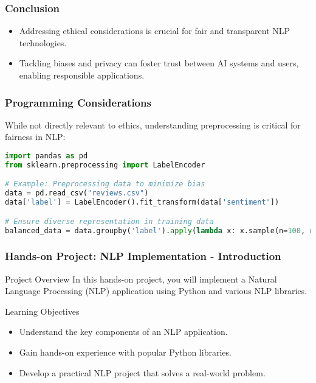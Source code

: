 \documentclass[aspectratio=169]{beamer}
\begin{document}
\begin{frame}
    \frametitle{Conclusion}
    \begin{itemize}
        \item Addressing ethical considerations is crucial for fair and transparent NLP technologies.
        \item Tackling biases and privacy can foster trust between AI systems and users, enabling responsible applications.
    \end{itemize}
\end{frame}

\begin{frame}[fragile]
    \frametitle{Programming Considerations}
    While not directly relevant to ethics, understanding preprocessing is critical for fairness in NLP:
    \begin{lstlisting}[language=Python]
import pandas as pd
from sklearn.preprocessing import LabelEncoder

# Example: Preprocessing data to minimize bias
data = pd.read_csv("reviews.csv")
data['label'] = LabelEncoder().fit_transform(data['sentiment'])

# Ensure diverse representation in training data
balanced_data = data.groupby('label').apply(lambda x: x.sample(n=100, random_state=1))
    \end{lstlisting}
\end{frame}

\begin{frame}[fragile]
    \frametitle{Hands-on Project: NLP Implementation - Introduction}
    \begin{block}{Project Overview}
        In this hands-on project, you will implement a Natural Language Processing (NLP) application using Python and various NLP libraries. 
    \end{block}
    \begin{block}{Learning Objectives}
        \begin{itemize}
            \item Understand the key components of an NLP application.
            \item Gain hands-on experience with popular Python libraries.
            \item Develop a practical NLP project that solves a real-world problem.
        \end{itemize}
    \end{block}
\end{frame}
\end{document}
